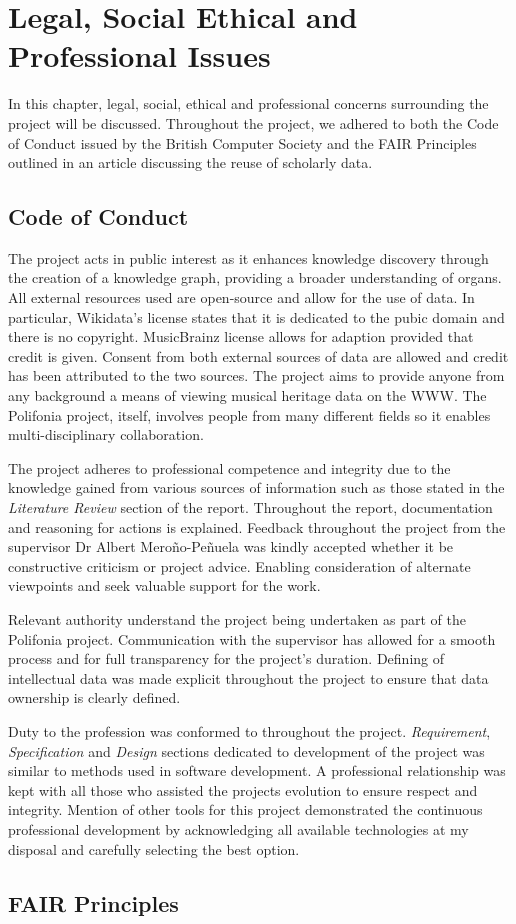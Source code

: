\chapter{Legal, Social Ethical and Professional Issues} 
In this chapter, legal, social, ethical and professional concerns surrounding the project will be discussed. Throughout the project, we adhered to both the Code of Conduct issued by the British Computer Society \cite{bcs} and the FAIR Principles \cite{fairprinciples} outlined in an article discussing the reuse of scholarly data.

\section{Code of Conduct}
\hspace{0.5cm} The project acts in public interest as it enhances knowledge discovery through the creation of a knowledge graph, providing a broader understanding of organs. All external resources used are open-source and allow for the use of data. In particular, Wikidata's license states that it is dedicated to the pubic domain and there is no copyright. MusicBrainz license allows for adaption provided that credit is given. Consent from both external sources of data are allowed and credit has been attributed to the two sources. The project aims to provide anyone from any background a means of viewing musical heritage data on the WWW. The Polifonia project, itself, involves people from many different fields so it enables multi-disciplinary collaboration.  

The project adheres to professional competence and integrity due to the knowledge gained from various sources of information such as those stated in the \textit{Literature Review} section of the report. Throughout the report, documentation and reasoning for actions is explained. Feedback throughout the project from the supervisor Dr Albert Mero{\~n}o-Pe{\~n}uela was kindly accepted whether it be constructive criticism or project advice. Enabling consideration of alternate viewpoints and seek valuable support for the work. 

Relevant authority understand the project being undertaken as part of the Polifonia project. Communication with the supervisor has allowed for a smooth process and for full transparency for the project's duration. Defining of intellectual data was made explicit throughout the project to ensure that data ownership is clearly defined.

Duty to the profession was conformed to throughout the project. \textit{Requirement}, \textit{Specification} and \textit{Design} sections dedicated to development of the project was similar to methods used in software development. A professional relationship was kept with all those who assisted the projects evolution to ensure respect and integrity. Mention of other tools for this project demonstrated the continuous professional development by acknowledging all available technologies at my disposal and carefully selecting the best option. 

\section{FAIR Principles}


